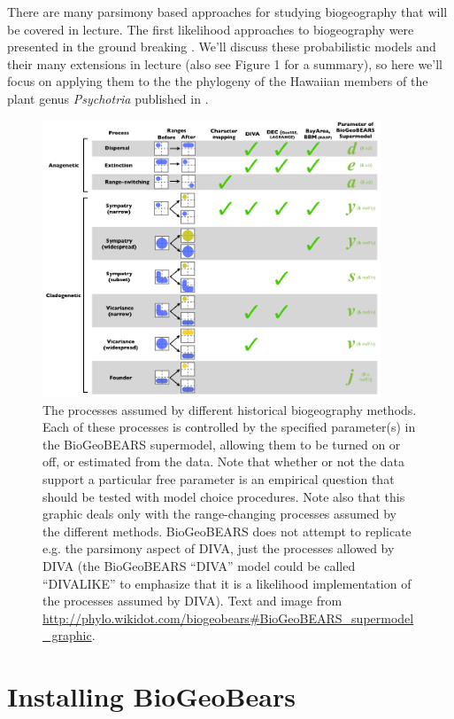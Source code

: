 \documentclass[11pt]{article}
\begin{document}
There are many parsimony based approaches for
studying biogeography that will be covered in lecture.
The first likelihood approaches to biogeography
were presented in the ground breaking \citet{ree2008maximum}.
We'll discuss these probabilistic models and their many
extensions in lecture (also see Figure 1 for a summary),
so here we'll focus on applying them
to the the phylogeny of the Hawaiian members of the
plant genus \textit{Psychotria} published in
\citet{ree2008maximum}.



\begin{figure}
\centering
\includegraphics[width=0.9\textwidth]{BioGeoBEARS_supermodel.png}
\caption{
The processes assumed by different historical biogeography methods. Each of these processes is controlled by the specified parameter(s) in the BioGeoBEARS supermodel, allowing them to be turned on or off, or estimated from the data. Note that whether or not the data support a particular free parameter is an empirical question that should be tested with model choice procedures. Note also that this graphic deals only with the range-changing processes assumed by the different methods. BioGeoBEARS does not attempt to replicate e.g. the parsimony aspect of DIVA, just the processes allowed by DIVA (the BioGeoBEARS ``DIVA'' model could be called ``DIVALIKE'' to emphasize that it is a likelihood implementation of the processes assumed by DIVA).
Text and image from \protect\url{http://phylo.wikidot.com/biogeobears\#BioGeoBEARS\_supermodel\_graphic}.}
\end{figure}


\section{Installing BioGeoBears}
\end{document}
